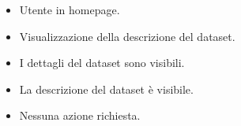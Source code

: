     \UCdsc
    { %
        \begin{itemize}
            \item Utente in homepage.
        \end{itemize}
    }
    { %
        \begin{itemize}
            \item Visualizzazione della descrizione del dataset.
        \end{itemize}
    }
    { %
        \begin{itemize}
            \item I dettagli del dataset sono visibili.
        \end{itemize}
    }
    { %
        \begin{itemize}
            \item La descrizione del dataset è visibile.
        \end{itemize}
    }
    { %
        \begin{itemize}
            \item Nessuna azione richiesta.
        \end{itemize}
    }



